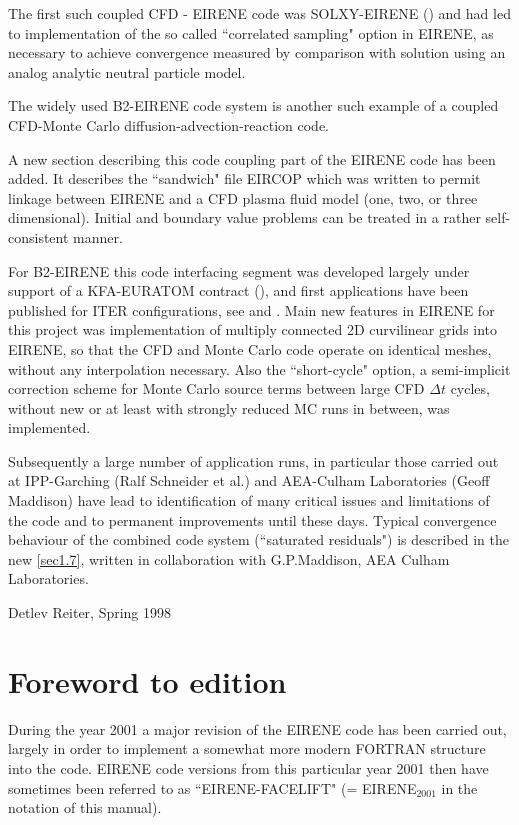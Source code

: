 The first such coupled \acs{CFD} - EIRENE code was SOLXY-EIRENE
(\cite{kn:Gerhauser88a}) and had led to implementation of the so called
``correlated sampling" option in EIRENE, as necessary to achieve convergence
measured by comparison with solution using an analog analytic neutral particle
model.

The widely used B2-EIRENE code system \cite{kn:Reiter91b} is another such
example of a coupled \acs{CFD}-Monte Carlo diffusion-advection-reaction code.

A new section describing this code coupling part of the EIRENE code has been
added.
It describes the ``sandwich" file EIRCOP which was written to permit linkage
between EIRENE and a \ac{CFD} plasma fluid model (one, two, or three
dimensional).
Initial and boundary value problems can be treated in a rather self-consistent
manner.

For B2-EIRENE this code interfacing segment was developed largely under support
of a KFA-EURATOM contract (\cite{kn:Net}), and first applications have been
published for ITER configurations, see \cite{kn:Reiter91b} and
\cite{kn:Maddison91}.
Main new features in EIRENE for this project was implementation of multiply
connected 2D curvilinear grids into EIRENE, so that the \ac{CFD} and Monte
Carlo code operate on identical meshes, without any interpolation necessary.
Also the ``short-cycle" option, a semi-implicit correction scheme for Monte
Carlo source terms between large \ac{CFD} $\Delta t$ cycles, without new or at
least with strongly reduced MC runs in between, was implemented.

Subsequently a large number of application runs, in particular those carried
out at IPP-Garching (Ralf Schneider et al.) and AEA-Culham Laboratories
(Geoff Maddison) have lead to identification of many critical issues and 
limitations of the code and to permanent improvements until these days.
Typical convergence behaviour of the combined code system (``saturated
residuals") is described in the new \cref{sec1.7}, written in collaboration
with G.P.Maddison, AEA Culham Laboratories.

Detlev Reiter, Spring	      1998 

\section*{Foreword to  edition} \label{forew3} \bigskip During
the year 2001 a major revision of the EIRENE code has been carried out, largely
in order to implement a somewhat more modern FORTRAN structure into the code.
EIRENE code versions from this particular year 2001 then have sometimes been
referred to as ``EIRENE-FACELIFT"  (= EIRENE$_{2001}$ in the notation of this
manual).

